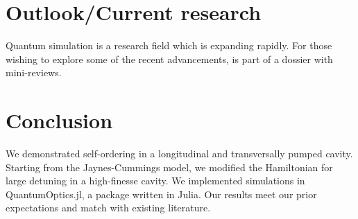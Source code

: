 \section{Outlook/Current research}
Quantum simulation is a research field which is expanding rapidly. For those wishing to explore some of the recent advancements, \cite{quantum_sanchez} is part of a dossier with mini-reviews.

\section{Conclusion}

We demonstrated self-ordering in a longitudinal and transversally pumped cavity. Starting from the Jaynes-Cummings model, we modified the Hamiltonian for large detuning in a high-finesse cavity. We implemented simulations in QuantumOptics.jl, a package written in Julia. Our results meet our prior expectations and match with existing literature.